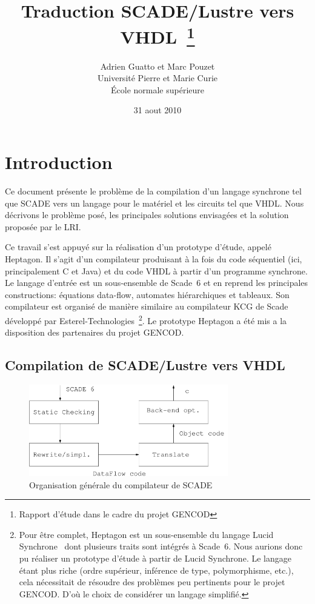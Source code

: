 \documentclass[a4paper]{article}
\title{Traduction SCADE/Lustre vers VHDL~\thanks{Rapport d'\'etude dans
    le cadre du projet GENCOD}}
\author{Adrien Guatto et Marc Pouzet
  \\ Universit\'e Pierre et Marie Curie \\
     \'Ecole normale sup\'erieure}
\date{31 aout 2010}
\newcommand{\LANG}{{\sc Heptagon}}
\newcommand{\lucy}{{\sc Lucid Synchrone}}
\newcommand{\scade}{{\sc Scade}}
\newcommand{\scadesix}{{\sc Scade~6}}
\begin{document}
\maketitle

\section{Introduction}
Ce document pr\'esente le probl\`eme de la compilation d'un langage
synchrone tel que SCADE vers un langage pour le mat\'eriel et les
circuits tel que VHDL. Nous d\'ecrivons le probl\`eme pos\'e, les
principales solutions envisag\'ees et la solution propos\'ee par le LRI.

Ce travail s'est appuy\'e sur la r\'ealisation d'un prototype d'\'etude,
appel\'e \LANG{}. Il s'agit d'un compilateur produisant \`a la fois du
code s\'equentiel (ici, principalement C et Java) et du code VHDL \`a
partir d'un programme synchrone. Le langage d'entr\'ee est un
sous-ensemble de \scadesix{} et en reprend les principales
constructions: \'equations data-flow, automates hi\'erarchiques et
tableaux. Son compilateur est organis\'e de mani\`ere similaire au
compilateur KCG de \scade{} d\'evelopp\'e par
Esterel-Technologies~\footnote{Pour \^etre complet, \LANG{} est un
  sous-ensemble du langage \lucy~\cite{lucy:manual06} dont plusieurs
  traits sont int\'egr\'es \`a \scadesix. Nous aurions donc pu
  r\'ealiser un prototype d'\'etude \`a partir de \lucy. Le
  langage \'etant plus riche (ordre sup\'erieur, inf\'erence de type,
  polymorphisme, etc.), cela n\'ecessitait de r\'esoudre des probl\`emes peu
  pertinents pour le projet GENCOD. D'o\`u le choix de consid\'erer un
  langage simplifi\'e.}.  Le prototype
\LANG{} a \'et\'e mis a la disposition des partenaires du projet GENCOD.

\subsection{Compilation de SCADE/Lustre vers VHDL}

\begin{figure}[t]
\begin{center}
\includegraphics[height=4cm]{Fig/compil-scade}
\end{center}
\caption{Organisation g\'en\'erale du compilateur de SCADE~\label{organisation-scade}}
\end{figure}
\end{document}
